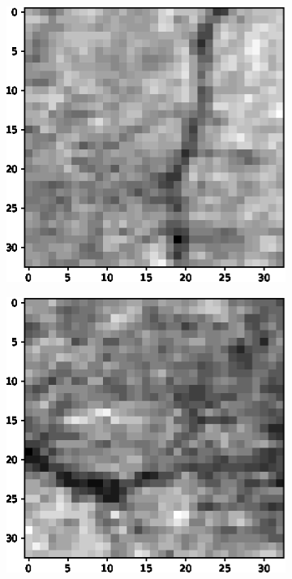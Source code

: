 \documentclass[aps,prb,10pt,twocolumn,groupedaddress]{revtex4-1}
\begin{document}
\begin{figure}[!t]
\begin{subfigure}[]{0.22\textwidth}
		\caption{}
	\end{subfigure}
	\hspace{1.55cm}
	\centering
    \begin{subfigure}[]{0.22\textwidth}
    	\centering
    	\includegraphics[width=\textwidth]{images/negative2.eps}
    	\caption{}
    \end{subfigure}
    \hspace{1.55cm}
    \centering
    \begin{subfigure}[]{0.22\textwidth}
    	\centering
    	\includegraphics[width=\textwidth]{images/negative3.eps}

\end{subfigure}
\end{figure}
\end{document}
